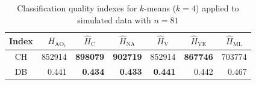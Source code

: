 \documentclass[journal]{IEEEtran}
\begin{document}
\begin{table}[htbp]
	\centering
	\caption{Classification quality indexes for $k$-means ($k=4$) applied to simulated data with $n=81$}
	\label{tab:CHyDB_synt}
	\begin{tabular}{crrrrrr}
		\midrule
		Index   & $H_{{\text{AO}}_1}$ & \multicolumn{1}{c}{$\widehat{H}_\text{C}$} & \multicolumn{1}{c}{$\widehat{H}_{\text{NA}}$} & \multicolumn{1}{c}{$\widehat{H}_\text{V}$} & \multicolumn{1}{c}{$\widehat{H}_{\text{VE}}$} & \multicolumn{1}{c}{$\widehat{H}_{\text{ML}}$} \\
		\midrule
		CH	&	852914	&	\textbf{898079}	&	\textbf{902719}	&	852914	&	\textbf{867746}	&	703774	\\
		DB	&	0.441	&	\textbf{0.434}	&	\textbf{0.433}	&	\textbf{0.441}	&	0.442	&	0.467	\\
		
		\midrule
		
	\end{tabular}%
	\label{tab:addlabel}
\end{table}%
\end{document}

